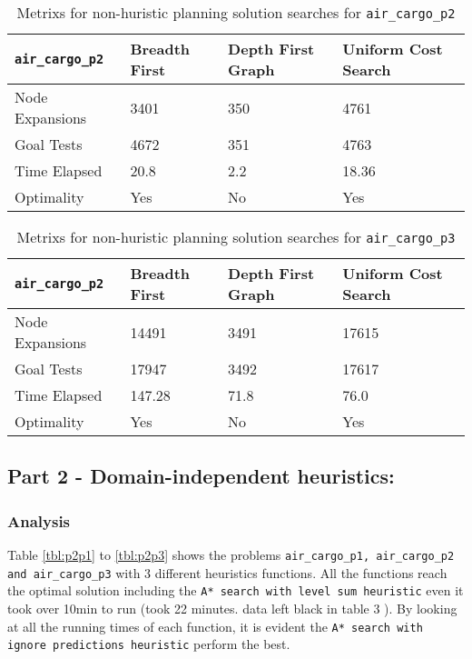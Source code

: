 \documentclass{article}
\begin{document}
\begin{table}[h]
\begin{center}
\begin{tabular}{|l|l|l|l|}
\hline
{\tt air\_cargo\_p2} & Breadth First & Depth First Graph& Uniform Cost Search \\ \hline\hline
Node Expansions& 3401  & 350 &4761 \\ 
Goal Tests & 4672 & 351 & 4763\\ 
Time Elapsed& 20.8 & 2.2 & 18.36\\ 
Optimality & Yes & No & Yes\\ \hline
\end{tabular}
\end{center}
\caption{Metrixs for non-huristic planning solution searches for {\tt air\_cargo\_p2}}
\label{tbl:p1p2}
\end{table}

\begin{table}[h]
\begin{center}
\begin{tabular}{|l|l|l|l|}
\hline
{\tt air\_cargo\_p2} & Breadth First & Depth First Graph& Uniform Cost Search \\ \hline\hline
Node Expansions& 14491  &  3491& 17615 \\ 
Goal Tests & 17947& 3492  & 17617 \\ 
Time Elapsed& 147.28 &71.8  & 76.0 \\ 
Optimality & Yes & No & Yes\\ \hline
\end{tabular}
\end{center}
\caption{Metrixs for non-huristic planning solution searches for {\tt air\_cargo\_p3}}
\label{tbl:p1p3}
\end{table}

\subsection*{Part 2 - Domain-independent heuristics:}
\subsubsection*{Analysis}
Table \ref{tbl:p2p1}  to  \ref{tbl:p2p3} shows the problems {\tt air\_cargo\_p1, air\_cargo\_p2 and air\_cargo\_p3} with 3 different heuristics functions. All the functions reach the optimal solution including the {\tt A* search with level sum heuristic} even it took over 10min to run (took 22 minutes. data left black in table 3 ).  By looking at all the running times of each function, it is evident the {\tt  A* search with ignore predictions heuristic} perform the best.
\end{document}
